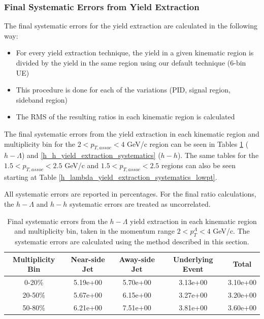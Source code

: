 \documentclass[ALICE,manyauthors]{ALICE_analysis_notes}
\begin{document}
\clearpage


\subsubsection{Final Systematic Errors from Yield Extraction}
The final systematic errors for the yield extraction are calculated in the following way:
\begin{itemize}
\item For every yield extraction technique, the yield in a given kinematic region is divided by the yield in the same region using our default technique (6-bin UE)
\item This procedure is done for each of the variations (PID, signal region, sideband region)
\item The RMS of the resulting ratios in each kinematic region is calculated
\end{itemize}

The final systematic errors from the yield extraction in each kinematic region and multiplicity bin for the  $2 < p_{T, assoc} < 4$ GeV/c region can be seen in Tables \ref{h_lambda_yield_extraction_systematics} ($h-\Lambda$) and \ref{h_h_yield_extraction_systematics} ($h-h$). The same tables for the  $1.5 < p_{T, assoc} < 2.5$ GeV/c and  $1.5 < p_{T, assoc} < 2.5$ regions can also be seen starting at Table \ref{h_lambda_yield_extraction_systematics_lowpt}. 

All systematic errors are reported in percentages. For the final ratio calculations, the $h-\Lambda$ and $h-h$ systematic errors are treated as uncorrelated.

\begin{table}[h!]
\centering
\begin{tabular}{| c | c | c | c | c | }
\hline
Multiplicity Bin & Near-side Jet & Away-side Jet & Underlying Event & Total  \\
\hline

0-20\% & 5.19e+00 & 5.70e+00  & 3.13e+00 & 3.10e+00 \\
20-50\% & 5.67e+00 & 6.15e+00  & 3.27e+00 & 3.20e+00 \\
50-80\% & 6.21e+00 & 7.51e+00  & 3.81e+00 & 3.60e+00 \\

\hline
\end{tabular}
\caption{Final systematic errors from the $h-\Lambda$ yield extraction in each kinematic region and multiplicity bin, taken in the momentum range $2 < p_{T}^{\Lambda} < 4$ GeV/c. The systematic errors are calculated using the method described in this section.}
\label{h_lambda_yield_extraction_systematics}
\end{table}
\end{document}
